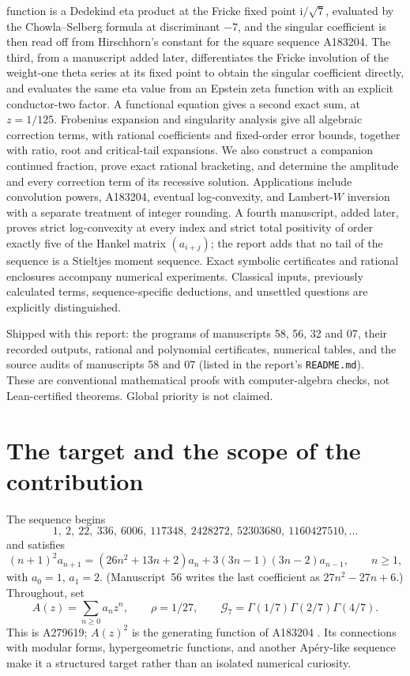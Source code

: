 \documentclass[11pt,letterpaper]{article}
\newcommand{\file}[1]{\nolinkurl{#1}}
\theoremstyle{remark}\newtheorem{remark}[theorem]{Remark}
\newcommand{\G}{\mathcal G_7}\newcommand{\Ast}{A_\star}
\newcommand{\ii}{\mathrm i}\newcommand{\ee}{\mathrm e}
\newcounter{l7gtrsavedeq}
\begin{document}
\begin{titlepage}
{function is a Dedekind eta product at the Fricke fixed point $\ii/\sqrt7$,
evaluated by the Chowla--Selberg formula at discriminant $-7$, and the
singular coefficient is then read off from Hirschhorn's constant for the
square sequence A183204. The third, from a manuscript added later,
differentiates the Fricke involution of the weight-one theta series at its
fixed point to obtain the singular coefficient directly, and evaluates the
same eta value from an Epstein zeta function with an explicit conductor-two
factor. A functional equation gives a second exact sum,
at $z=1/125$. Frobenius expansion and singularity analysis give all
algebraic correction terms, with rational coefficients and fixed-order
error bounds, together with ratio, root and critical-tail expansions. We
also construct a companion continued fraction, prove exact rational
bracketing, and determine the amplitude and every correction term of its
recessive solution. Applications include convolution powers, A183204,
eventual log-convexity, and Lambert-$W$ inversion with a separate
treatment of integer rounding. A fourth manuscript, added later, proves
strict log-convexity at every index and strict total positivity of order
exactly five of the Hankel matrix $(a_{i+j})$; the report adds that no tail
of the sequence is a Stieltjes moment sequence. Exact symbolic certificates and rational
enclosures accompany numerical experiments. Classical inputs, previously
calculated terms, sequence-specific deductions, and unsettled questions
are explicitly distinguished.\par}
\vfill
\noindent\small
Shipped with this report: the programs of manuscripts 58, 56, 32 and 07,
their recorded outputs, rational and polynomial certificates, numerical
tables, and the source audits of manuscripts 58 and 07 (listed in the
report's \file{README.md}).\\
These are conventional mathematical proofs with computer-algebra checks,
not Lean-certified theorems. Global priority is not claimed.
\end{titlepage}
\hypersetup{pageanchor=true}
\tableofcontents\newpage

\section{The target and the scope of the contribution}\label{l7g:sec:target}
The sequence begins
\[
1,\ 2,\ 22,\ 336,\ 6006,\ 117348,\ 2428272,\ 52303680,\ 1160427510,\ldots
\]
and satisfies
\begin{equation}\label{l7g:eq:rec}
(n+1)^2a_{n+1}=(26n^2+13n+2)a_n+3(3n-1)(3n-2)a_{n-1},\qquad n\ge1,
\end{equation}
with $a_0=1$, $a_1=2$. (Manuscript~56 writes the last coefficient as
$27n^2-27n+6$.) Throughout, set
\begin{equation}\label{l7g:eq:defs}
 A(z)=\sum_{n\ge0}a_nz^n,\qquad \rho=1/27,\qquad
 \G=\Gamma(1/7)\Gamma(2/7)\Gamma(4/7).
\end{equation}
This is A279619; $A(z)^2$ is the generating function of A183204
\cite{l7g:oeis279619,l7g:oeis183204}. Its connections with modular forms,
hypergeometric functions, and another Ap\'ery-like sequence make it a
structured target rather than an isolated numerical curiosity.
\end{document}
